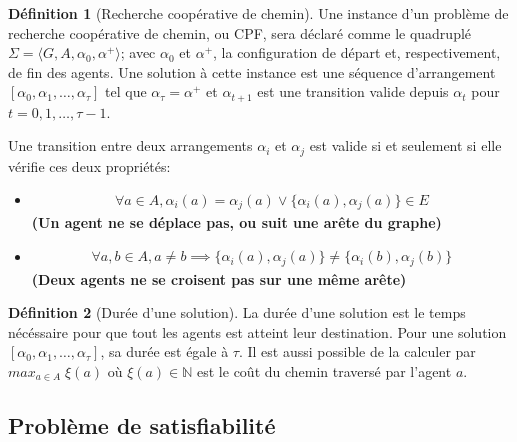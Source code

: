 \documentclass[french, 10pt, letterpaper]{article}
\theoremstyle{definition}
\newtheorem{definition}{Définition}[subsection]
\theoremstyle{proposition}
\theoremstyle{example}
\begin{document}
    \begin{definition}[Recherche coopérative de chemin]
        Une instance d'un problème de recherche coopérative de chemin, ou CPF, sera déclaré comme le quadruplé $\Sigma = \langle G, A, \alpha_0, \alpha^+ \rangle$;
        avec $\alpha_0$ et $\alpha^+$, la configuration de départ et, respectivement, de fin des agents.
        Une solution à cette instance est une séquence d'arrangement $[\alpha_0, \alpha_1, \ldots, \alpha_\tau]$ tel que $\alpha_\tau = \alpha^+$ 
        et $\alpha_{t+1}$ est une transition valide depuis $\alpha_t$ pour $t=0, 1, \ldots, \tau - 1$.
        
        Une transition entre deux arrangements $\alpha_i$ et $\alpha_j$ est valide si et seulement si elle vérifie ces deux propriétés:

        \begin{itemize}
            \item[] 
                \begin{gather}
                    \label{def:deplacement}
                    \forall a \in A, \alpha_i(a) = \alpha_j(a) \lor \{\alpha_i(a),\alpha_j(a)\} \in E
                \end{gather}
                \textbf{(Un agent ne se déplace pas, ou suit une arête du graphe)}
            \item[] 
                \begin{gather}
                    \label{def:croisement}
                    \forall a, b \in A, a \neq b \implies \{\alpha_i(a), \alpha_j(a)\} \neq \{\alpha_i(b), \alpha_j(b)\}
                \end{gather}
                \textbf{(Deux agents ne se croisent pas sur une même arête)}
        \end{itemize}
    \end{definition}

    \begin{definition}[Durée d'une solution]
        \label{sec:makespan}
        La durée d'une solution est le temps nécéssaire pour que tout les agents est atteint leur destination. 
        Pour une solution $[\alpha_0, \alpha_1, \ldots, \alpha_\tau]$, sa durée est égale à $\tau$.
        Il est aussi possible de la calculer par $max_{a \in A}\; \xi(a)$ où $\xi(a) \in \mathbb{N}$ est le coût du chemin traversé par l'agent $a$.
    \end{definition}

    \subsection{Problème de satisfiabilité}
\end{document}
